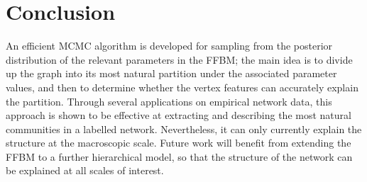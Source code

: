 \section{Conclusion}
\label{sec:conclusion}

An efficient MCMC algorithm 
is developed for sampling 
from the posterior distribution of
the relevant parameters in the FFBM;
the main idea is to divide up the graph into 
its most natural partition under the associated
parameter values, and then to determine whether 
the vertex features can accurately explain the partition. 
Through several applications on empirical
network data, this approach 
is shown to be effective at extracting and describing 
the most natural communities in a labelled network. 
Nevertheless, it
can only currently explain the structure at the macroscopic
scale. Future work will benefit from extending 
the FFBM to a further hierarchical model,
so that
the structure of the network 
can be explained at all scales of interest.


